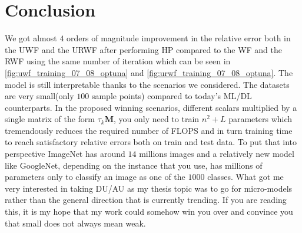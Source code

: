 \chapter{Conclusion}

We got almost $4$ orders of magnitude improvement in the relative error both in the \ac{UWF} and the 
\ac{URWF} after performing \ac{HP}\cite{Hutter2019}\cite{Akiba2019} compared to 
the \ac{WF} and the \ac{RWF} using the same number of iteration which can be seen in 
\cref{fig:uwf_training_07_08_optuna} and \ref{fig:urwf_training_07_08_optuna}. The model is still interpretable thanks 
to the scenarios we considered. The datasets are very small(only $100$ sample points) compared to today's 
\ac{ML}/\ac{DL}\cite{Goodfellow2016}\cite{LeCun2015} counterparts\cite{Krizhevsky2017}\cite{Szegedy2014}. In 
the proposed winning scenarios, different scalars multiplied by a single matrix of the form $\tau_k\boldsymbol{M}$, 
you only need to train $n^2+L$ parameters which tremendously reduces the required number of 
\ac{FLOPS}\cite{Hager2010}\cite{Hennessy2019} and in turn training time to reach satisfactory relative errors both 
on train and test data. To put that into perspective ImageNet\cite{SVLL2021} has around $14$ millions images and a 
relatively new model like GoogleNet\cite{Szegedy2014}, depending on the instance that you use, has millions of 
parameters only to classify an image as one of the $1000$ classes. What got me very interested in taking 
\ac{DU}/\ac{AU}\cite{Monga2019} as my thesis topic was to go for micro-models rather than the general direction 
that is currently trending. If you are reading this, it is my hope that my work could somehow win you over and convince 
you that small does not always mean weak.